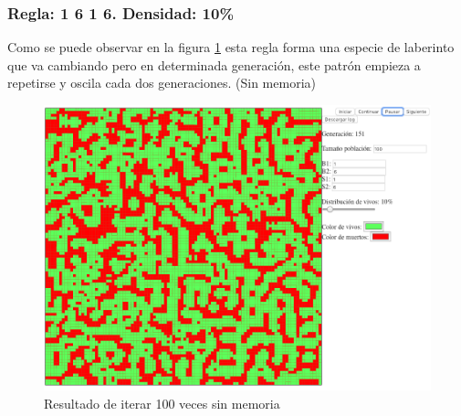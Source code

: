 	\subsubsection{Regla: 1 6 1 6. Densidad: 10\%}
	Como se puede observar en la figura \ref{fig:golm15} esta regla forma una especie de laberinto que va cambiando pero en determinada generación, este patrón empieza a repetirse y oscila cada dos generaciones. (Sin memoria)
	\begin{figure}[H]
		\begin{center}
			\includegraphics[scale=.3]{GOLM/img/regla1616-0.png}
			\caption{Resultado de iterar 100 veces sin memoria}
			\label{fig:golm15}
		\end{center}
	\end{figure}

